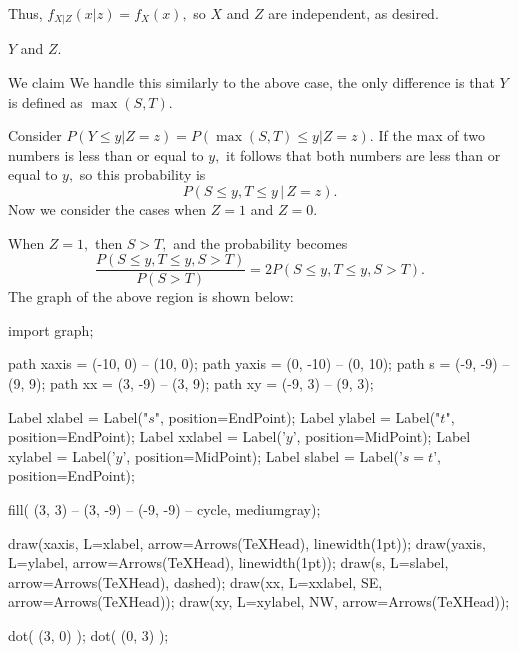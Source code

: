 \documentclass{article}
\begin{document}
\begin{enumerate}
\begin{enumerate}
\begin{enumerate}
\begin{soln}
			Thus, $f_{X|Z}(x|z) = f_X(x),$ so $X$ and $Z$ are independent, as desired.

			\end{soln}

			\ii $Y$ and $Z.$

			\begin{soln}
				We claim  We handle this similarly to the above case, the only difference is that $Y$ is defined as $\max{(S, T)}.$ 

				Consider $P(Y\le y|Z=z)=P(\max{(S,T)}\le y|Z=z).$ If the max of two numbers is less than or equal to $y,$ it follows that both numbers are less than or equal to $y,$ so this probability is \[P(S\le y, T\le y\, \vert\, Z=z).\] Now we consider the cases when $Z=1$ and $Z=0.$

				When $Z=1,$ then $S>T,$ and the probability becomes \[\frac{P(S\le y, T\le y, S>T)}{P(S>T)}=2P(S\le y, T\le y, S>T).\] The graph of the above region is shown below:

				\begin{center}
					\begin{asy}
						import graph;

						path xaxis = (-10, 0) -- (10, 0);
						path yaxis = (0, -10) -- (0, 10);
						path s = (-9, -9) -- (9, 9);
						path xx = (3, -9) -- (3, 9);
						path xy = (-9, 3) -- (9, 3);

						Label xlabel = Label("$s$", position=EndPoint);
						Label ylabel = Label("$t$", position=EndPoint);
						Label xxlabel = Label('$y$', position=MidPoint);
						Label xylabel = Label('$y$', position=MidPoint);
						Label slabel = Label('$s=t$', position=EndPoint);

						fill( (3, 3) -- (3, -9) -- (-9, -9) -- cycle, mediumgray);

						draw(xaxis, L=xlabel, arrow=Arrows(TeXHead), linewidth(1pt));
						draw(yaxis, L=ylabel, arrow=Arrows(TeXHead), linewidth(1pt));
						draw(s, L=slabel, arrow=Arrows(TeXHead), dashed);
						draw(xx, L=xxlabel, SE, arrow=Arrows(TeXHead));
						draw(xy, L=xylabel, NW, arrow=Arrows(TeXHead));

						dot( (3, 0) );
						dot( (0, 3) );
					\end{asy}
				\end{center}


\end{soln}
\end{enumerate}
\end{enumerate}
\end{enumerate}
\end{document}
